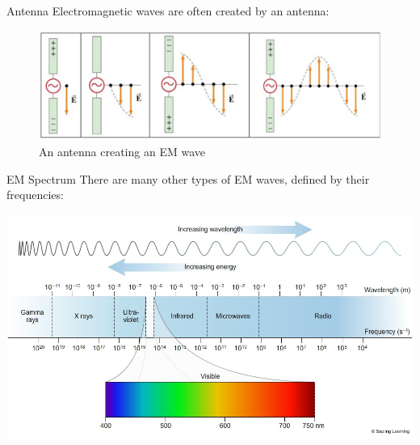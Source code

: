 \documentclass{beamer}
\begin{document}
\begin{frame}{Antenna}
    Electromagnetic waves are often created by an antenna:
    \begin{figure}
        \centering
        \includegraphics[scale=.4]{antenna.png}
        \caption{An antenna creating an EM wave}
        \label{fig:antenna}
    \end{figure}
\end{frame}

\begin{frame}{EM Spectrum}
    There are many other types of EM waves, defined by their frequencies:

    \includegraphics[scale=.3]{emspectrum.jpg}
    
\end{frame}
\end{document}
